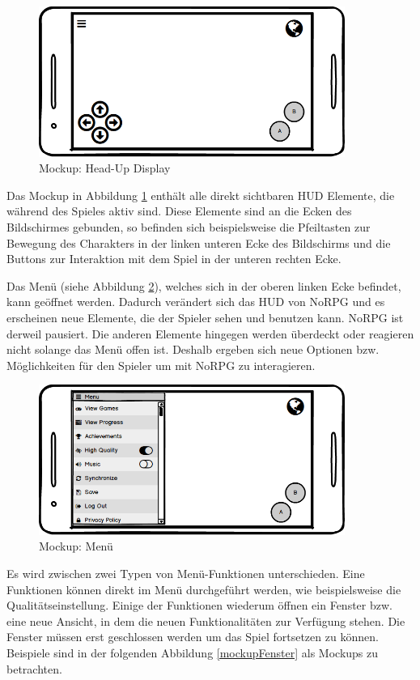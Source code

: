 			\begin{figure}[htbp]
				\centering 
				\label{mockupHUD}
				\includegraphics[width=10cm]{pics/HUD.png}
				\caption{Mockup: Head-Up Display}
			\end{figure}
			
			Das Mockup in Abbildung \ref{mockupHUD} enthält alle direkt sichtbaren HUD Elemente, die während des Spieles aktiv sind. Diese Elemente sind an die Ecken des Bildschirmes gebunden, so befinden sich beispielsweise die Pfeiltasten zur Bewegung des Charakters in der linken unteren Ecke des Bildschirms und die Buttons zur Interaktion mit dem Spiel in der unteren rechten Ecke. 
			
			Das Menü (siehe Abbildung \ref{mockupMenu}), welches sich in der oberen linken Ecke befindet, kann geöffnet werden. Dadurch verändert sich das HUD von NoRPG und es erscheinen neue Elemente, die der Spieler sehen und benutzen kann. NoRPG ist derweil pausiert. Die anderen Elemente hingegen werden überdeckt oder reagieren nicht solange das Menü offen ist. Deshalb ergeben sich neue Optionen bzw. Möglichkeiten für den Spieler um mit NoRPG zu interagieren.
			
			\begin{figure}[htbp]
				\centering 
				\label{mockupMenu}
				\includegraphics[width=10cm]{pics/Menu.png}
				\caption{Mockup: Menü}
			\end{figure}
			
			Es wird zwischen zwei Typen von Menü-Funktionen unterschieden. Eine Funktionen können direkt im Menü durchgeführt werden, wie beispielsweise die Qualitätseinstellung. Einige der Funktionen wiederum öffnen ein Fenster bzw. eine neue Ansicht, in dem die neuen Funktionalitäten zur Verfügung stehen. Die Fenster müssen erst geschlossen werden um das Spiel fortsetzen zu können. Beispiele sind in der folgenden Abbildung \ref{mockupFenster} als Mockups zu betrachten.
			
